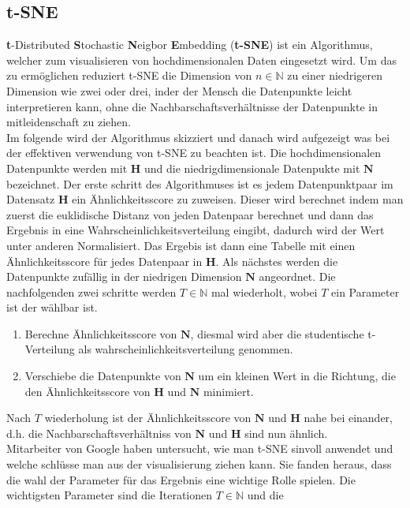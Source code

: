 \documentclass[12pt,letterpaper,ngerman]{article}
\begin{document}
\subsection{t-SNE}
{\bf t}-Distributed {\bf S}tochastic {\bf N}eigbor {\bf E}mbedding ({\bf t-SNE})
ist ein Algorithmus, welcher zum visualisieren von hochdimensionalen Daten 
eingesetzt wird. Um das zu ermöglichen reduziert t-SNE die Dimension von 
$n \in \mathbb{N}$ zu einer niedrigeren Dimension wie zwei oder drei, inder
der Mensch die Datenpunkte leicht interpretieren kann, ohne die 
Nachbarschaftsverhältnisse der Datenpunkte in mitleidenschaft zu ziehen.\\
Im folgende wird der Algorithmus skizziert und danach wird aufgezeigt was bei 
der effektiven verwendung von t-SNE zu beachten ist. Die hochdimensionalen 
Datenpunkte werden mit $\mathbf{H}$ und die niedrigdimensionale Datenpukte mit
$\mathbf{N}$ bezeichnet. Der erste schritt des Algorithmuses ist es 
jedem Datenpunktpaar im Datensatz $\mathbf{H}$ ein Ähnlichkeitsscore zu zuweisen.
Dieser wird berechnet indem man zuerst die euklidische Distanz von jeden Datenpaar
berechnet und dann das Ergebnis in eine Wahrscheinlichkeitsverteilung eingibt,
dadurch wird der Wert unter anderen Normalisiert. Das Ergebis ist dann eine 
Tabelle mit einen Ähnlichkeitsscore für jedes Datenpaar in $\mathbf{H}$. Als
nächstes werden die Datenpunkte zufällig in der niedrigen Dimension 
$\mathbf{N}$ angeordnet. Die nachfolgenden zwei schritte werden $T\in \mathbb{N}$
mal wiederholt, wobei $T$ ein Parameter ist der wählbar ist.
\begin{enumerate}
  \item Berechne Ähnlichkeitsscore von $\mathbf{N}$, diesmal wird aber die
      studentische t-Verteilung als wahrscheinlichkeitsverteilung genommen. 
  \item Verschiebe die Datenpunkte von $\mathbf{N}$ um ein kleinen Wert in
    die Richtung, die den Ähnlichkeitsscore von $\mathbf{H}$
    und $\mathbf{N}$ minimiert.
\end{enumerate}
Nach $T$ wiederholung ist der Ähnlichkeitsscore von $\mathbf{N}$ und $\mathbf{H}$
nahe bei einander, d.h. die Nachbarschaftsverhältniss von $\mathbf{N}$ und 
$\mathbf{H}$ sind nun ähnlich.\\
Mitarbeiter von Google haben untersucht, wie man t-SNE sinvoll anwendet und
welche schlüsse man aus der visualisierung ziehen kann. Sie fanden heraus,
dass die wahl der Parameter für das Ergebnis eine wichtige Rolle spielen.
Die wichtigsten Parameter sind die Iterationen $T\in \mathbb{N}$ und die
\end{document}
